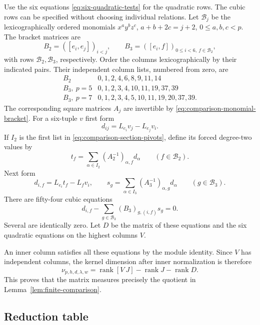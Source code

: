 \documentclass[11pt]{article}
\theoremstyle{plain}
\theoremstyle{definition}
\theoremstyle{remark}
\numberwithin{equation}{section}
\begin{document}
Use the six equations \eqref{eq:six-quadratic-tests} for the
quadratic rows. The cubic rows can be specified without choosing
individual relations. Let \(\mathcal B_j\) be the lexicographically
ordered monomials \(x^ay^bz^c\), \(a+b+2c=j+2\), \(0\le a,b,c<p\).
The bracket matrices are
\[
 B_2=( [e_i,e_j])_{i<j},\qquad
 B_3=( [e_i,f])_{0\le i<6,\ f\in\mathcal B_2},
\]
with rows \(\mathcal B_2,\mathcal B_3\), respectively.
Order the columns lexicographically by their indicated pairs.
Their independent column lists, numbered from zero, are
\begin{equation}\label{eq:comparison-section-pivots}
\begin{array}{c|l}
 B_2&0,1,2,4,6,8,9,11,14\\
 B_3,\ p=5&0,1,2,3,4,10,11,19,37,39\\
 B_3,\ p=7&0,1,2,3,4,5,10,11,19,20,37,39.
\end{array}
\end{equation}
The corresponding square matrices \(A_j\) are invertible by
\eqref{eq:comparison-monomial-bracket}.
For a six-tuple \(v\) first form
\[
 d_{ij}=L_{e_i}v_j-L_{e_j}v_i.
\]
If \(I_2\) is the first list in
\eqref{eq:comparison-section-pivots}, define its forced
degree-two values by
\[
 t_f=\sum_{\alpha\in I_2}(A_2^{-1})_{\alpha,f}d_\alpha
                    \qquad(f\in\mathcal B_2).
\]
Next form
\[
 d_{i,f}=L_{e_i}t_f-L_fv_i,\qquad
 s_g=\sum_{\alpha\in I_3}(A_3^{-1})_{\alpha,g}d_\alpha
                    \qquad(g\in\mathcal B_3).
\]
There are fifty-four cubic equations
\begin{equation}\label{eq:comparison-cubic-rows}
 d_{i,f}-\sum_{g\in\mathcal B_3}(B_3)_{g,(i,f)}s_g=0.
\end{equation}
Several are identically zero. Let \(D\)
be the matrix of these equations and the six quadratic equations
on the highest columns \(V\).

An inner column satisfies all these equations by the module
identity. Since \(V\) has independent columns, the kernel dimension
after inner normalization is therefore
\begin{equation}\label{eq:comparison-rank}
 \nu_{p,h,d,\lambda,w}
 =\operatorname{rank}[V\ J]-\operatorname{rank}J
                                      -\operatorname{rank}D.
\end{equation}
This proves that the matrix measures precisely the quotient in
Lemma~\ref{lem:finite-comparison}.

\subsection{Reduction table}
\end{document}
